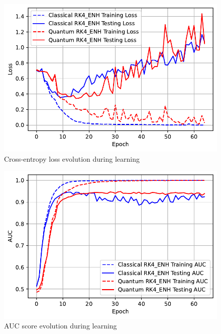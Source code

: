 \documentclass[]{beamer}
\begin{document}
\begin{frame}
  \begin{figure}[th]
    \centering
    \includegraphics[scale=0.7]{./pics/new_pdf_graphs/hybrid/hybrid_transfomer_loss_imdb_rk4_enh.pdf}
    \caption[Cross-entropy loss evolution during learning]{Cross-entropy loss evolution during learning}
    \label{fig:p26}
  \end{figure}
\end{frame}

\begin{frame}
  \begin{figure}
    \includegraphics[scale=0.7]{./pics/new_pdf_graphs/hybrid/hybrid_auc_imdb_.pdf}
    \caption[AUC score evolution during learning]{AUC score evolution during learning}
    \label{fig:p27}
  \end{figure}
\end{frame}
\end{document}
